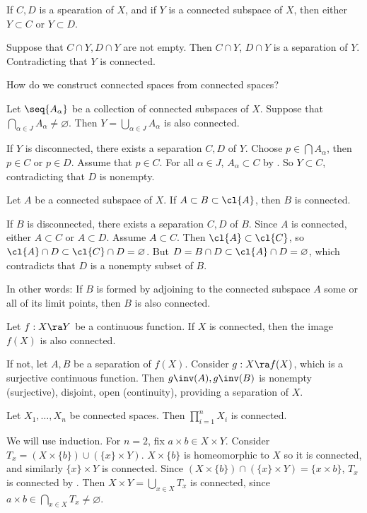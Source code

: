  If \(C, D\) is a spearation of \(X\), and if \(Y\) is a connected subspace of \(X\), then either \(Y \subset C\) or \(Y \subset D\).

\pf Suppose that \(C \cap Y, D \cap Y\) are not empty. Then \(C \cap Y\), \(D \cap Y\) is a separation of \(Y\). Contradicting that \(Y\) is connected.

How do we construct connected spaces from connected spaces?

 Let \(\seq{A_\alpha}\) be a collection of connected subspaces of \(X\). Suppose that \(\bigcap_{\alpha \in J} A_\alpha \neq \varnothing\). Then \(Y = \bigcup_{\alpha \in J} A_\alpha\) is also connected.

\pf If \(Y\) is disconnected, there exists a separation \(C, D\) of \(Y\). Choose \(p \in \bigcap A_\alpha\), then \(p \in C\) or \(p \in D\). Assume that \(p \in C\). For all \(\alpha \in J\), \(A_\alpha \subset C\) by . So \(Y \subset C\), contradicting that \(D\) is nonempty.

 Let \(A\) be a connected subspace of \(X\). If \(A \subset B \subset \cl{A}\), then \(B\) is connected.

\pf If \(B\) is disconnected, there exists a separation \(C, D\) of \(B\). Since \(A\) is connected, either \(A \subset C\) or \(A \subset D\). Assume \(A \subset C\). Then \(\cl{A} \subset \cl{C}\), so \(\cl{A} \cap D \subset \cl{C} \cap D = \varnothing\). But \(D = B \cap D \subset \cl{A} \cap D = \varnothing\), which contradicts that \(D\) is a nonempty subset of \(B\).

In other words: If \(B\) is formed by adjoining to the connected subspace \(A\) some or all of its limit points, then \(B\) is also connected.

 Let \(f : X \ra Y\) be a continuous function. If \(X\) is connected, then the image \(f(X)\) is also connected.

\pf If not, let \(A, B\) be a separation of \(f(X)\). Consider \(g : X \ra f(X)\), which is a surjective continuous function. Then \(g\inv(A), g\inv(B)\) is nonempty (surjective), disjoint, open (continuity), providing a separation of \(X\).

 Let \(X_1, \dots, X_n\) be connected spaces. Then \(\prod_{i=1}^n X_i\) is connected.

\pf We will use induction. For \(n = 2\), fix \(a \times b \in X \times Y\). Consider \(T_x = (X \times \{b\}) \cup (\{x\} \times Y)\). \(X \times \{b\}\) is homeomorphic to \(X\) so it is connected, and similarly \(\{x\} \times Y\) is connected. Since \((X \times \{b\}) \cap (\{x\} \times Y) = \{x \times b\}\), \(T_x\) is connected by . Then \(X \times Y = \bigcup_{x \in X} T_x\) is connected, since \(a \times b \in \bigcap_{x \in X} T_x \neq \varnothing\).

